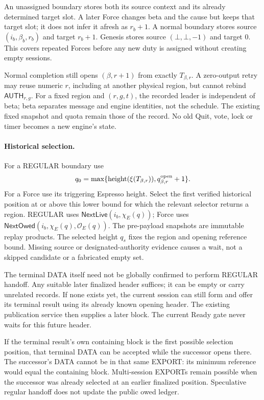 \documentclass[11pt,a4paper]{article}
\newcommand{\tagg}[1]{\ensuremath{\mathsf{#1}}}
\begin{document}
An unassigned boundary stores both its source context and its already
determined target slot. A later Force changes beta and the cause but
keeps that target slot; it does not infer it afresh as $r_b+1$.
A normal boundary stores source $(i_b,\beta_b,r_b)$ and target $r_b+1$.
Genesis stores source $(\bot,\bot,-1)$ and target 0. This covers repeated
Forces before any new duty is assigned without creating empty sessions.

Normal completion still opens $(\beta,r+1)$ from exactly
$T_{\beta,r}$. A zero-output retry may reuse numeric $r$, including at
another physical region, but cannot rebind $\tagg{AUTH}_{r,g}$.
For a fixed region and $(r,g,t)$, the recorded leader is independent
of beta; beta separates message and engine identities, not the schedule.
The existing fixed snapshot and quota remain those of the record.
No old Quit, vote, lock or timer becomes a new engine's state.

\paragraph{Historical selection.}
For a REGULAR boundary use
\[
 q_0=\max\{\operatorname{height}(\xi(T_{\beta,r})),
                         q^{\rm open}_{\beta,r}+1\}.
\]
For a Force use its triggering Espresso height. Select the first
verified historical position at or above this lower bound for which
the relevant selector returns a region. REGULAR uses
$\tagg{NextLive}(i_b,\chi_E(q))$; Force uses
$\tagg{NextOwed}(i_b,\chi_E(q),\mathcal O_E(q))$.
The pre-payload snapshots are immutable replay products. The selected
height $q_s$ fixes the region and opening reference bound. Missing
source or designated-authority evidence causes a wait, not a skipped
candidate or a fabricated empty set.

The terminal DATA itself need not be globally confirmed to perform
REGULAR handoff. Any suitable later finalized header suffices; it can
be empty or carry unrelated records. If none exists yet, the current
session can still form and offer its terminal result using its already
known opening header. The existing publication service then supplies
a later block. The current Ready gate never waits for this future header.

If the terminal result's own containing block is the first possible
selection position, that terminal DATA can be accepted while the
successor opens there. The successor's DATA cannot be in that same
EXPORT: its minimum reference would equal the containing block.
Multi-session EXPORTs remain possible when the successor was already
selected at an earlier finalized position. Speculative regular handoff
does not update the public owed ledger.
\end{document}
